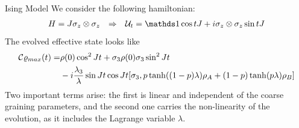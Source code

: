 \begin{frame}{Ising Model}
    We consider the following hamiltonian:
    \begin{align*}
        H=J\sigma_{z}\otimes\sigma_{z} && \Rightarrow && \mcU_{t}=\Id \cos{tJ} + i\sigma_{z}\otimes\sigma_{z}\sin{tJ}
    \end{align*}
    The evolved effective state looks like
    \begin{align*}
        \mathcal{C}{\varrho_{max}(t)}=&\rho(0)\cos^{2}{Jt}+\sigma_{3}\rho(0)\sigma_{3}\sin^{2}{Jt}\\
        &-i\frac{\lambda_{3}}{\lambda}\sin{Jt}\cos{Jt}[\sigma_{3},p\tanh((1-p)\lambda)\rho_{A}+(1-p)\tanh(p\lambda)\rho_{B}]
    \end{align*}
    Two important terms arise: the first is linear and independent of the coarse graining parameters, and the second one carries the non-linearity of the evolution, as it includes the Lagrange variable $\lambda$.
\end{frame}